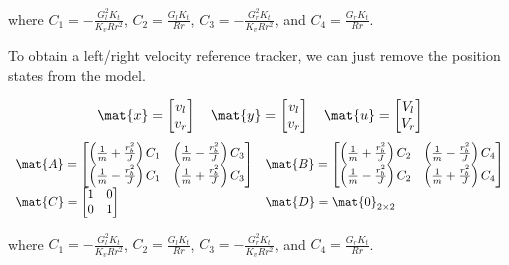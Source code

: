 where $C_1 = -\frac{G_l^2 K_t}{K_v R r^2}$, $C_2 = \frac{G_l K_t}{Rr}$,
$C_3 = -\frac{G_r^2 K_t}{K_v R r^2}$, and $C_4 = \frac{G_r K_t}{Rr}$.

To obtain a left/right velocity \gls{reference} tracker, we can just remove the
position \glspl{state} from the \gls{model}.
\begin{theorem}
  \label{thm:ramsete_decoupled_ref_tracker}
  \begin{equation*}
    \mat{x} =
    \begin{bmatrix}
      v_l \\
      v_r
    \end{bmatrix}
    \quad
    \mat{y} =
    \begin{bmatrix}
      v_l \\
      v_r
    \end{bmatrix}
    \quad
    \mat{u} =
    \begin{bmatrix}
      V_l \\
      V_r
    \end{bmatrix}
  \end{equation*}
  \begin{equation}
    \begin{array}{ll}
      \mat{A} =
      \begin{bmatrix}
        \left(\frac{1}{m} + \frac{r_b^2}{J}\right) C_1 &
          \left(\frac{1}{m} - \frac{r_b^2}{J}\right) C_3 \\
        \left(\frac{1}{m} - \frac{r_b^2}{J}\right) C_1 &
          \left(\frac{1}{m} + \frac{r_b^2}{J}\right) C_3
      \end{bmatrix} &
      \mat{B} =
      \begin{bmatrix}
        \left(\frac{1}{m} + \frac{r_b^2}{J}\right) C_2 &
          \left(\frac{1}{m} - \frac{r_b^2}{J}\right) C_4 \\
        \left(\frac{1}{m} - \frac{r_b^2}{J}\right) C_2 &
          \left(\frac{1}{m} + \frac{r_b^2}{J}\right) C_4
      \end{bmatrix} \\
      \mat{C} =
      \begin{bmatrix}
        1 & 0 \\
        0 & 1 \\
      \end{bmatrix} &
      \mat{D} = \mat{0}_{2 \times 2}
    \end{array}
  \end{equation}

  where $C_1 = -\frac{G_l^2 K_t}{K_v R r^2}$, $C_2 = \frac{G_l K_t}{Rr}$,
  $C_3 = -\frac{G_r^2 K_t}{K_v R r^2}$, and $C_4 = \frac{G_r K_t}{Rr}$.
\end{theorem}

